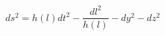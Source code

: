 \begin{equation}
ds^2 =h(l)dt^2 - \frac{dl^2}{h(l)} - dy^2-dz^2
\label{classofmetrics}
\end{equation}


